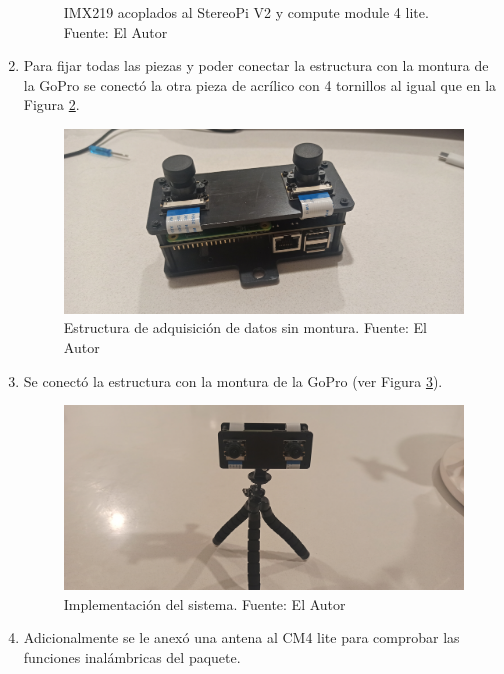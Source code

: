 \begin{enumerate}
\begin{figure}[H]
        \caption[IMX219 acoplados al StereoPi V2 y compute module 4 lite.]{IMX219 acoplados al StereoPi V2 y compute module 4 lite. {\footnotesize Fuente: El Autor}}
        \label{module_installed}
    \end{figure}
    \item Para fijar todas las piezas y poder conectar la estructura con la montura de la GoPro se conectó la otra pieza de acrílico con 4 tornillos al igual que en la Figura \ref{two_acrilics}.
    \begin{figure}[H]
        \centering
        \includegraphics[scale=0.05]{Recursos/two_pastic_installed.jpg}
        \caption[Estructura de adquisición de datos sin montura.]{Estructura de adquisición de datos sin montura. {\footnotesize Fuente: El Autor}}
        \label{two_acrilics}
    \end{figure}
    \item Se conectó la estructura con la montura de la GoPro (ver Figura \ref{implemented_stereo_pi}).
    \begin{figure}[H]
        \centering
        \includegraphics[scale=0.05]{Recursos/implemented_stereopiv2.jpg}
        \caption[Implementación del sistema.]{Implementación del sistema. {\footnotesize Fuente: El Autor}}
        \label{implemented_stereo_pi}
    \end{figure}
    \item Adicionalmente se le anexó una antena al CM4 lite para comprobar las funciones inalámbricas del paquete.
\end{enumerate}
